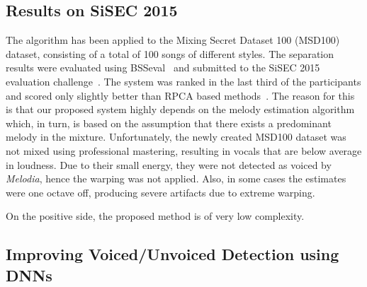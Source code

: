 \subsection{Results on SiSEC 2015}
\label{ssec:performance_sisec15}

The algorithm has been applied to the Mixing Secret Dataset 100 (MSD100) dataset, consisting of a total of 100 songs of different styles.
The separation results were evaluated using BSSeval~\cite{fevotte05} and submitted to the SiSEC 2015 evaluation challenge~\cite{ono15}.
The system was ranked in the last third of the participants and scored only slightly better than RPCA based methods~\cite{huang12}.
The reason for this is that our proposed system highly depends on the melody estimation algorithm which, in turn, is based on the assumption that there exists a predominant melody in the mixture.
Unfortunately, the newly created MSD100 dataset was not mixed using professional mastering, resulting in vocals that are below average in loudness.
Due to their small energy, they were not detected as voiced by \emph{Melodia}, hence the warping was not applied. Also, in some cases the estimates were one octave off, producing severe artifacts due to extreme warping.\par
On the positive side, the proposed method is of very low complexity.

\subsection{Improving Voiced/Unvoiced Detection using DNNs}

